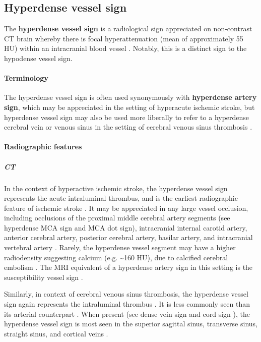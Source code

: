 \subsection{Hyperdense vessel sign}

The \textbf{hyperdense vessel sign} is a radiological sign appreciated on non-contrast CT brain whereby there is focal hyperattenuation (mean of approximately 55 HU) within an intracranial blood vessel . Notably, this is a distinct sign to the hypodense vessel sign.

\paragraph{Terminology}

The hyperdense vessel sign is often used synonymously with \textbf{hyperdense artery sign}, which may be appreciated in the setting of hyperacute ischemic stroke, but hyperdense vessel sign may also be used more liberally to refer to a hyperdense cerebral vein or venous sinus in the setting of cerebral venous sinus thrombosis .

\paragraph{Radiographic features}

\subparagraph{CT}

In the context of hyperactive ischemic stroke, the hyperdense vessel sign represents the acute intraluminal thrombus, and is the earliest radiographic feature of ischemic stroke . It may be appreciated in any large vessel occlusion, including occlusions of the proximal middle cerebral artery segments (see hyperdense MCA sign and MCA dot sign), intracranial internal carotid artery, anterior cerebral artery, posterior cerebral artery, basilar artery, and intracranial vertebral artery . Rarely, the hyperdense vessel segment may have a higher radiodensity suggesting calcium (e.g. \textasciitilde160 HU), due to calcified cerebral embolism . The MRI equivalent of a hyperdense artery sign in this setting is the susceptibility vessel sign .

Similarly, in context of cerebral venous sinus thrombosis, the hyperdense vessel sign again represents the intraluminal thrombus . It is less commonly seen than its arterial counterpart . When present (see dense vein sign and cord sign ), the hyperdense vessel sign is most seen in the superior sagittal sinus, transverse sinus, straight sinus, and cortical veins .

